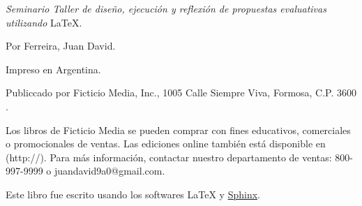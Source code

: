 \begin{flushleft}
	\textit{\large Seminario \sphinxhyphen{} Taller de diseño, ejecución y reflexión de propuestas evaluativas utilizando} \LaTeX{}.
	
	Por Ferreira, Juan David.
	
	
	Impreso en Argentina.
	
	Publiccado por Ficticio Media, Inc., 1005 Calle Siempre Viva, Formosa, C.P. $3600$.
	
	Los libros de Ficticio Media se pueden comprar con fines educativos, comerciales o promocionales de ventas.
	Las ediciones online también está disponible en (http://).
	Para más información, contactar nuestro departamento de ventas: 800-997-9999 o juandavid9a0@gmail.com.
	
	\vspace*{\fill}
	
	Este libro fue escrito usando los softwares \LaTeX{} y \href{https://www.sphinx-doc.org/en/master/}{Sphinx}.\\
	
	\vspace*{\fill}
	

\end{flushleft}
